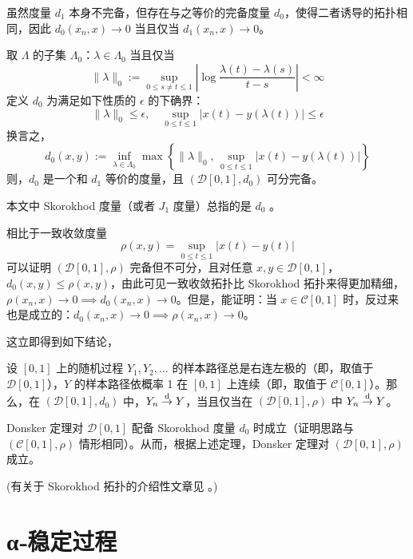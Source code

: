 虽然度量 $d_1$ 本身不完备，但存在与之等价的完备度量 $d_0$，使得二者诱导的拓扑相同，因此 $d_0(x_n,x)\to 0$ 当且仅当 $d_1(x_n,x)\to 0$。

\begin{theorem}

取 $\Lambda$ 的子集 $\Lambda_0$：$\lambda\in\Lambda_0$ 当且仅当
\[\|\lambda\|_0:=\sup_{0\le s\ne t\le 1}\left|\log\frac{\lambda(t)-\lambda(s)}{t-s}\right|<\infty\]
定义 $d_0$ 为满足如下性质的 $\epsilon$ 的下确界：
\[\|\lambda\|_0\le\epsilon,\quad \sup_{0\le t\le 1}|x(t)-y(\lambda(t))|\le\epsilon\]
换言之，
\[d_0(x,y):=\inf_{\lambda\in\Lambda_0}\max\left\{\|\lambda\|_0,\,\sup_{0\le t\le 1}|x(t)-y(\lambda(t))|\right\}\]
则，$d_0$ 是一个和 $d_1$ 等价的度量，且 $(\mathcal D[0,1], d_0)$ 可分完备。


\end{theorem}
本文中 Skorokhod 度量（或者 $J_1$ 度量）总指的是 $d_0$ 。

相比于一致收敛度量
\[\rho(x,y)=\sup_{0\le t\le 1}|x(t)-y(t)|\]
可以证明 $(\mathcal D[0,1],\rho)$ 完备但不可分，且对任意 $x,y\in \mathcal D[0,1]$，$d_0(x,y)\le \rho (x,y)$，由此可见一致收敛拓扑比 Skorokhod 拓扑来得更加精细，$\rho(x_n,x)\to 0\implies d_0(x_n,x)\to 0$。但是，能证明：当 $x\in\mathcal C[0,1]$ 时，反过来也是成立的：$d_0(x_n, x)\to 0\implies \rho(x_n,x)\to 0$。

这立即得到如下结论，

\begin{theorem}

设 $[0,1]$ 上的随机过程 $Y_1,Y_2,\dots$ 的样本路径总是右连左极的（即，取值于 $\mathcal D[0,1]$），$Y$ 的样本路径依概率 1 在 $[0,1]$ 上连续（即，取值于 $\mathcal C[0,1]$）。那么，在 $(\mathcal D[0,1],d_0)$ 中，$Y_n\overset{\rm d}\to Y$，当且仅当在 $(\mathcal D[0,1],\rho)$ 中 $Y_n\overset{\rm d}\to Y$。

\end{theorem}

\begin{corollary}\label{cor:ext-fclt:donsker-skorokhod}
Donsker 定理对 $\mathcal D[0,1]$ 配备 Skorokhod 度量 $d_0$ 时成立（证明思路与 $(\mathcal C[0,1], \rho)$ 情形相同）。从而，根据上述定理，Donsker 定理对 $(\mathcal D[0,1],\rho)$ 成立。
\end{corollary}

(有关于 Skorokhod 拓扑的介绍性文章见 \cite{kern2023}。)

\section{α‑稳定过程}


